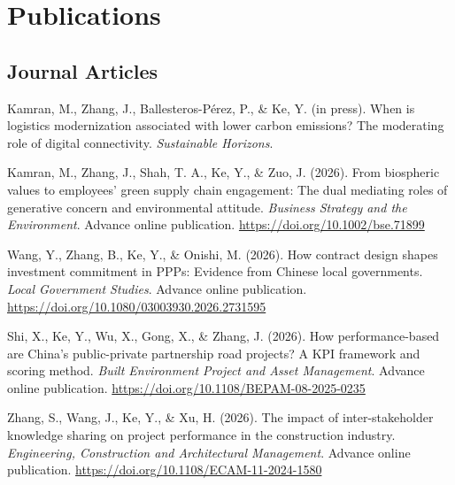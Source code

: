 \documentclass[11pt,a4paper]{report} %
\begin{document}
    

    \section*{Publications}

    \subsection*{Journal Articles}

    \begin{tablist}

        \item[2026] \tab{}Kamran, M., Zhang, J., Ballesteros-Pérez, P., \& Ke, Y. (in press). When is logistics modernization associated with lower carbon emissions? The moderating role of digital connectivity. \textit{Sustainable Horizons}.

        \item[2026] \tab{}Kamran, M., Zhang, J., Shah, T. A., Ke, Y., \& Zuo, J. (2026). From biospheric values to employees’ green supply chain engagement: The dual mediating roles of generative concern and environmental attitude. \textit{Business Strategy and the Environment}. Advance online publication. \href{https://doi.org/10.1002/bse.71899}{https://doi.org/10.1002/bse.71899}

        \item[2026] \tab{}Wang, Y., Zhang, B., Ke, Y., \& Onishi, M. (2026). How contract design shapes investment commitment in PPPs: Evidence from Chinese local governments. \textit{Local Government Studies}. Advance online publication. \href{https://doi.org/10.1080/03003930.2026.2731595}{https://doi.org/10.1080/03003930.2026.2731595}
        
        \item[2026] \tab{}Shi, X., Ke, Y., Wu, X., Gong, X., \& Zhang, J. (2026). How performance-based are China’s public-private partnership road projects? A KPI framework and scoring method. \textit{Built Environment Project and Asset Management}. Advance online publication. \href{https://doi.org/10.1108/BEPAM-08-2025-0235}{https://doi.org/10.1108/BEPAM-08-2025-0235}
        
        \item[2026] \tab{}Zhang, S., Wang, J., Ke, Y., \& Xu, H. (2026). The impact of inter-stakeholder knowledge sharing on project performance in the construction industry. \textit{Engineering, Construction and Architectural Management}. Advance online publication. \href{https://doi.org/10.1108/ECAM-11-2024-1580}{https://doi.org/10.1108/ECAM-11-2024-1580}


\end{tablist}
\end{document}
